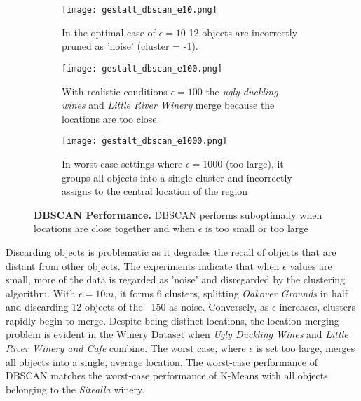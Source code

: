 \begin{figure*}[h]
\centering

\begin{subfigure}[t]{.3\textwidth}
\texttt{[image: gestalt\_dbscan\_e10.png]}
\caption{In the optimal case of $\epsilon=10$ 12 objects are incorrectly pruned as 'noise' (cluster = -1).} %
\label{fig:dbscan_optimal}
\end{subfigure}
\hfill
\begin{subfigure}[t]{.3\textwidth}
\texttt{[image: gestalt\_dbscan\_e100.png]}
\caption{\small With realistic conditions $\epsilon=100$ the \textit{ugly duckling wines} and \textit{Little River Winery} merge because the locations are too close.}
\label{fig:dbscan_realistic}
\end{subfigure}
\hfill
\begin{subfigure}[t]{.3\textwidth}
\texttt{[image: gestalt\_dbscan\_e1000.png]}
\caption{\small In worst-case settings where $\epsilon=1000$ (too large), it groups all objects into a single cluster and incorrectly assigns to the central location of the region}
\label{fig:kmeans_worst}
\hfill
\end{subfigure}

\caption{\textbf{DBSCAN Performance.} DBSCAN performs suboptimally when locations are close together and when $\epsilon$ is too small or too large}

\label{fig:dbscan_experiments}
\end{figure*}

Discarding objects is problematic as it degrades the recall of objects that are distant from other objects. The experiments indicate that when $\epsilon$ values are small, more of the data is regarded as 'noise' and disregarded by the clustering algorithm. With $\epsilon=10m$, it forms 6 clusters, splitting \textit{Oakover Grounds} in half and discarding 12 objects of the ~150 as noise. Conversely, as $\epsilon$ increases, clusters rapidly begin to merge. Despite being distinct locations, the location merging problem is evident in the Winery Dataset when \textit{Ugly Duckling Wines} and \textit{Little River Winery and Cafe} combine. The worst case, where $\epsilon$ is set too large, merges all objects into a single, average location. The worst-case performance of DBSCAN matches the worst-case performance of K-Means with all objects belonging to the \textit{Sitealla} winery. 

